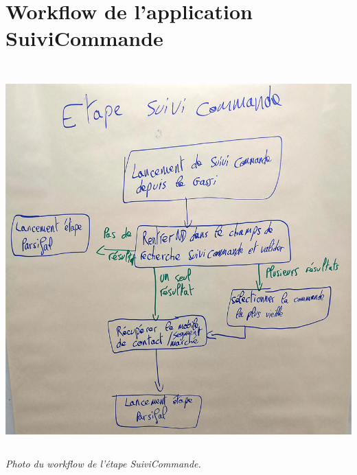 \documentclass[a4paper,twoside,12pt,openright]{report}
\begin{document}
\chapter{Workflow de l'application SuiviCommande}
\begin{center}
\includegraphics[height=15cm]{workflowSuiviCommande.jpg}\\
\itshape Photo du workflow de l'étape SuiviCommande.
\end{center}
\end{document}

